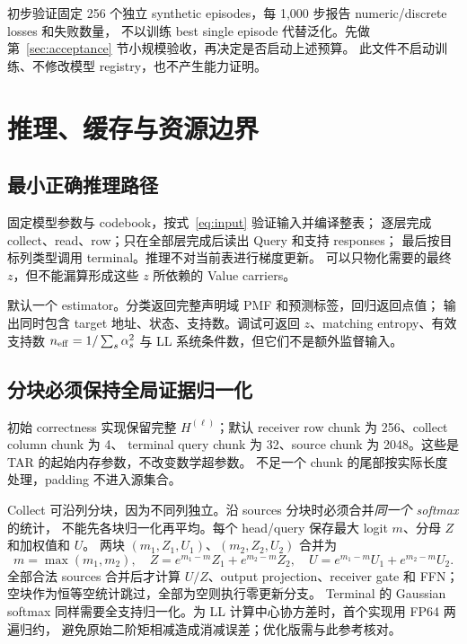 \documentclass[11pt,UTF8,fontset=fandol]{ctexart}
\begin{document}
初步验证固定 256 个独立 synthetic episodes，每 1,000 步报告 numeric/discrete losses 和失败数量，
不以训练 best single episode 代替泛化。先做第~\ref{sec:acceptance} 节小规模验收，再决定是否启动上述预算。
此文件不启动训练、不修改模型 registry，也不产生能力证明。

\section{推理、缓存与资源边界}
\label{sec:inference}

\subsection{最小正确推理路径}
固定模型参数与 codebook，按式~\eqref{eq:input} 验证输入并编译整表；
逐层完成 collect、read、row；只在全部层完成后读出 Query 和支持 responses；
最后按目标列类型调用 terminal。推理不对当前表进行梯度更新。
可以只物化需要的最终 $z$，但不能漏算形成这些 $z$ 所依赖的 Value carriers。

默认一个 estimator。分类返回完整声明域 PMF 和预测标签，回归返回点值；
输出同时包含 target 地址、状态、支持数。调试可返回 $z$、matching entropy、有效支持数
$n_{\rm eff}=1/\sum_s\alpha_s^2$ 与 LL 系统条件数，但它们不是额外监督输入。

\subsection{分块必须保持全局证据归一化}
初始 correctness 实现保留完整 $H^{(\ell)}$；默认 receiver row chunk 为 256、collect column chunk 为 4、
terminal query chunk 为 32、source chunk 为 2048。这些是 TAR 的起始内存参数，不改变数学超参数。
不足一个 chunk 的尾部按实际长度处理，padding 不进入源集合。

Collect 可沿列分块，因为不同列独立。沿 sources 分块时必须合并\emph{同一个 softmax} 的统计，
不能先各块归一化再平均。每个 head/query 保存最大 logit $m$、分母 $Z$ 和加权值和 $U$。
两块 $(m_1,Z_1,U_1)$、$(m_2,Z_2,U_2)$ 合并为
\begin{equation}
 m=\max(m_1,m_2),\quad
 Z=e^{m_1-m}Z_1+e^{m_2-m}Z_2,\quad
 U=e^{m_1-m}U_1+e^{m_2-m}U_2.
 \label{eq:stream}
\end{equation}
全部合法 sources 合并后才计算 $U/Z$、output projection、receiver gate 和 FFN；
空块作为恒等空统计跳过，全部为空则执行零更新分支。
Terminal 的 Gaussian softmax 同样需要全支持归一化。为 LL 计算中心协方差时，首个实现用 FP64 两遍归约，
避免原始二阶矩相减造成消减误差；优化版需与此参考核对。
\end{document}
